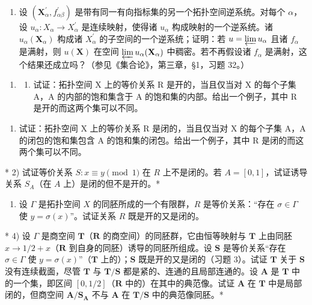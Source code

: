 \begin{enumerate}
\def\labelenumi{\alph{enumi})}
\setcounter{enumi}{1}
\tightlist
\item
  设 \((\mathbf{X}_{\alpha}^{\prime}, f_{\alpha\beta}^{\prime})\) 是带有同一有向指标集的另一个拓扑空间逆系统。对每个 \(\alpha\)，设 \(u_{\alpha}: X_{\alpha} \to X_{\alpha}^{\prime}\) 是连续映射，使得诸 \(u_{\alpha}\) 构成映射的一个逆系统。诸 \(u_{\alpha}(\mathbf{X}_{\alpha})\) 构成诸 \(X_{\alpha}^{\prime}\) 的子空间的一个逆系统；证明：若 \(u = \varprojlim u_{\alpha}\) 且诸 \(f_{\alpha}\) 是满射，则 \(u(\mathbf{X})\) 在空间 \(\varprojlim u_{\alpha}(\mathbf{X}_{\alpha})\) 中稠密。若不再假设诸 \(f_{\alpha}\) 是满射，这个结果还成立吗？（参见《集合论》，第三章，§1，习题 32。）
\end{enumerate}

\BourbakiExerciseGroup

\begin{enumerate}
\def\labelenumi{\arabic{enumi})}
\tightlist
\item
  \begin{enumerate}
  \def\labelenumii{\alph{enumii})}
  \tightlist
  \item
    试证：拓扑空间 X 上的等价关系 R 是开的，当且仅当对 X 的每个子集 A，A 的内部的饱和集含于 A 的饱和集的内部。给出一个例子，其中 R 是开的而这两个集可以不同。
  \end{enumerate}
\end{enumerate}

\begin{enumerate}
\def\labelenumi{\alph{enumi})}
\setcounter{enumi}{1}
\tightlist
\item
  试证：拓扑空间 X 上的等价关系 R 是闭的，当且仅当对 X 的每个子集 A，A 的闭包的饱和集包含 A 的饱和集的闭包。给出一个例子，其中 R 是闭的而这两个集可以不同。
\end{enumerate}

* 2) 试证等价关系 \(S: x \equiv y \pmod{1}\) 在 \(R\) 上不是闭的。若 \(A = [0,1]\)，试证诱导关系 \(S_A\)（在 \(A\) 上）是闭的但不是开的。*

\begin{enumerate}
\def\labelenumi{\arabic{enumi})}
\setcounter{enumi}{2}
\tightlist
\item
  设 \(\Gamma\) 是拓扑空间 \(X\) 的同胚所成的一个有限群，\(R\) 是等价关系：“存在 \(\sigma \in \Gamma\) 使 \(y = \sigma(x)\)”。试证关系 \(R\) 既是开的又是闭的。
\end{enumerate}

* 4) 设 \(\Gamma\) 是商空间 \(\mathbf{T}\)（\(\mathbf{R}\) 的商空间）的同胚群，它由恒等映射与 \(\mathbf{T}\) 上由同胚 \(x \to 1/2 + x\)（\(\mathbf{R}\) 到自身的同胚）诱导的同胚所组成。设 \(\mathbf{S}\) 是等价关系“存在 \(\sigma \in \Gamma\) 使 \(y = \sigma(x)\)”（\(\mathbf{T}\) 上的）；\(\mathbf{S}\) 既是开的又是闭的（习题 3）。试证 \(\mathbf{T}\) 关于 \(\mathbf{S}\) 没有连续截面，尽管 \(\mathbf{T}\) 与 \(\mathbf{T}/\mathbf{S}\) 都是紧的、连通的且局部连通的。设 \(\mathbf{A}\) 是 \(\mathbf{T}\) 中的一个集，即区间 \([0,1/2]\)（\(\mathbf{R}\) 中的）在其中的典范像。试证 \(\mathbf{A}\) 在 \(\mathbf{T}\) 中是局部闭的，但商空间 \(\mathbf{A}/\mathbf{S}_{\mathbf{A}}\) 不与 \(\mathbf{A}\) 在 \(\mathbf{T}/\mathbf{S}\) 中的典范像同胚。*

